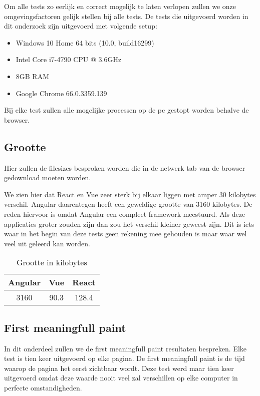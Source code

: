 Om alle tests zo eerlijk en correct mogelijk te laten verlopen zullen we onze omgevingsfactoren gelijk stellen bij alle tests. De tests die uitgevoerd worden in dit onderzoek zijn uitgevoerd met volgende setup:

\begin{itemize}
	\item Windows 10 Home 64 bits (10.0, build16299)
	\item Intel Core i7-4790 CPU @ 3.6GHz
	\item 8GB RAM
	\item Google Chrome 66.0.3359.139
\end{itemize}

Bij elke test zullen alle mogelijke processen op de pc gestopt worden behalve de browser.

\subsection{Grootte}
\label{sec:grootte}

Hier zullen de filesizes besproken worden die in de netwerk tab van de browser gedownload moeten worden.

We zien hier dat React en Vue zeer sterk bij elkaar liggen met amper 30 kilobytes verschil. Angular daarentegen heeft een geweldige grootte van 3160 kilobytes. De reden hiervoor is omdat Angular een compleet framework meestuurd. Als deze applicaties groter zouden zijn dan zou het verschil kleiner geweest zijn. Dit is iets waar in het begin van deze tests geen rekening mee gehouden is maar waar wel veel uit geleerd kan worden.

\begin{table}[]
	\centering
	\caption{Grootte in kilobytes}
	\label{table:file_sizes}
	\begin{tabular}{|c|c|c|} \hline
		Angular &Vue   &React \\ \hline
		3160     &90.3  &128.4 \\ \hline
	\end{tabular}
\end{table}

\subsection{First meaningfull paint}
\label{sec:first_meaningfull_paint}

In dit onderdeel zullen we de first meaningfull paint resultaten bespreken. Elke test is tien keer uitgevoerd op elke pagina. De first meaningfull paint is de tijd waarop de pagina het eerst zichtbaar wordt. Deze test werd maar tien keer uitgevoerd omdat deze waarde nooit veel zal verschillen op elke computer in perfecte omstandigheden.

